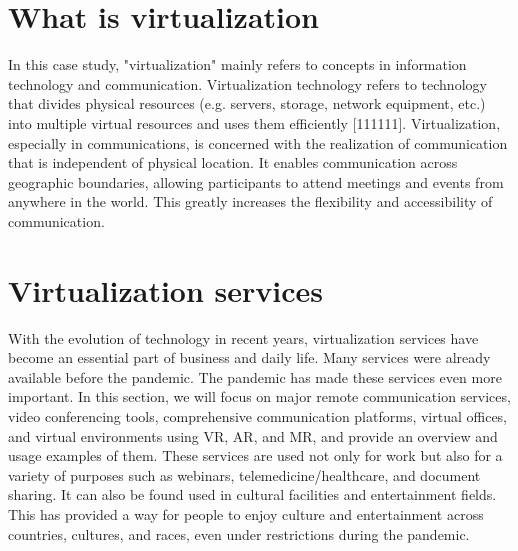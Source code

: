 \documentclass[12pt]{article}
\begin{document}
\section{What is virtualization}
In this case study, "virtualization" mainly refers to concepts in information
technology and communication. Virtualization technology refers to technology
that divides physical resources (e.g. servers, storage, network equipment,
etc.) into multiple virtual resources and uses them efficiently [111111].
Virtualization, especially in communications, is concerned with the realization
of communication that is independent of physical location. It enables
communication across geographic boundaries, allowing participants to attend
meetings and events from anywhere in the world. This greatly increases the
flexibility and accessibility of communication.

\newpage
\section{Virtualization services}
With the evolution of technology in recent years, virtualization services have
become an essential part of business and daily life. Many services were already
available before the pandemic. The pandemic has made these services even more
important. In this section, we will focus on major remote communication
services, video conferencing tools, comprehensive communication platforms,
virtual offices, and virtual environments using VR, AR, and MR, and provide an
overview and usage examples of them. These services are used not only for work
but also for a variety of purposes such as webinars, telemedicine/healthcare,
and document sharing. It can also be found used in cultural facilities and
entertainment fields. This has provided a way for people to enjoy culture and
entertainment across countries, cultures, and races, even under restrictions
during the pandemic.
\end{document}
